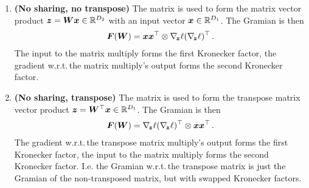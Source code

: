\begin{enumerate}
\item \textbf{(No sharing, no transpose)} The matrix is used to form the matrix vector product ${\bm{z}} = {\bm{W}} {\bm{x}} \in {\mathbb{R}}^{D_2}$ with an input vector ${\bm{x}} \in {\mathbb{R}}^{D_1}$.
  The Gramian is then
  \begin{align*}
    {\bm{F}}({\bm{W}}) = {\bm{x}} {\bm{x}}^{\top} \otimes \nabla_{\!{{\bm{z}}}}\ell (\nabla_{\!{{\bm{z}}}}\ell)^{\top}\,.
  \end{align*}
  The input to the matrix multiply forms the first Kronecker factor, the gradient w.r.t.\,the matrix multiply's output forms the second Kronecker factor.

\item \textbf{(No sharing, transpose)} The matrix is used to form the transpose matrix vector product ${\bm{z}} = {\bm{W}}^{\top} {\bm{x}} \in {\mathbb{R}}^{D_1}$.
  The Gramian is then
  \begin{align*}
    {\bm{F}}({\bm{W}}) = \nabla_{\!{{\bm{z}}}}\ell (\nabla_{\!{{\bm{z}}}}\ell)^{\top} \otimes {\bm{x}} {\bm{x}}^{\top}\,.
  \end{align*}
  The gradient w.r.t.\,the transpose matrix multiply's output forms the first Kronecker factor, the input to the matrix multiply forms the second Kronecker factor.
  I.e.
  the Gramian w.r.t.\,the transpose matrix is just the Gramian of the non-transposed matrix, but with swapped Kronecker factors.


\end{enumerate}
